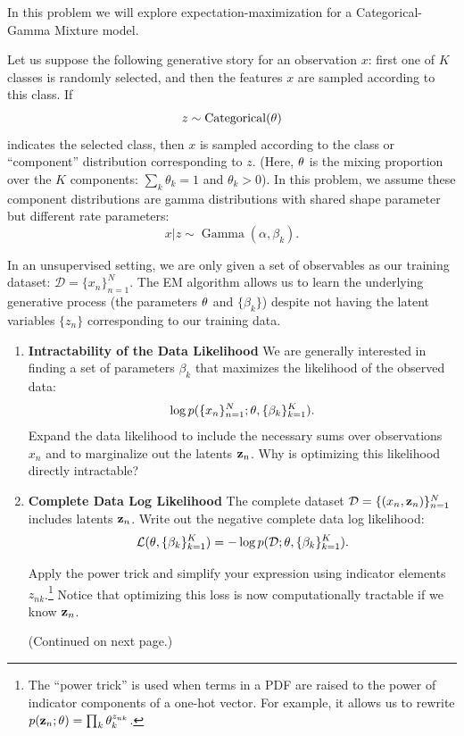 \documentclass[submit]{harvardml}
\begin{document}
\begin{problem}

In this problem we will explore expectation-maximization for a Categorical-Gamma Mixture model.

Let us suppose the following generative story for an observation $x$: first one of $K$ classes is randomly selected, and then the features $x$ are sampled according to this class. If $$z \sim \operatorname{Categorical}(\mathbf{\theta})$$ indicates the selected class, then $x$ is sampled according to the class or ``component'' distribution corresponding to $z$. (Here, $\mathbf{\theta}$ is the mixing proportion over the $K$ components: $\sum_k \theta_k = 1$ and $ \theta_k > 0$). In this problem, we assume these component distributions are gamma distributions with shared shape parameter but different rate parameters: $$x | z \sim \operatorname{Gamma}(\alpha, \beta_k).$$

In an unsupervised setting, we are only given a set of observables as our training dataset: $\mathcal D = \{x_n\}_{n=1}^N$. The EM algorithm allows us to learn the underlying generative process (the parameters $\mathbf{\theta}$ and $\{\beta_k\}$) despite not having the latent variables $\{z_n\}$ corresponding to our training data.

\vspace{2em}

\begin{enumerate}

  \item \textbf{Intractability of the Data Likelihood} We are
    generally interested in finding a set of parameters $\beta_k$ that
    maximizes the likelihood of the observed data: $$\log
    p(\{x_n\}^N_{n=1}; \mathbf{\theta}, \{\beta_k\}^K_{k = 1}).$$ Expand the data
    likelihood to include the necessary sums over observations
    $x_n$ and to marginalize out the latents
    $\mathbf{z}_n$. Why is optimizing this likelihood directly
    intractable?

\item \textbf{Complete Data Log Likelihood} The complete dataset
  $\mathcal D = \{(x_n, \mathbf{z}_n)\}_{n=1}^N$ includes latents $\mathbf{z}_n$. Write
  out the negative complete data log likelihood: $$\mathcal{L}(\mathbf{\theta}, \{\beta_k\}^K_{k=1}) =  -\log p(\mathcal D; \mathbf{\theta}, \{\beta_k\}^K_{k=1}).$$

  Apply the power trick and simplify your expression using indicator elements $z_{n
  k}$.\footnote{The ``power trick'' is used when terms in a PDF are raised to the power of indicator components of a one-hot vector.  For example, it allows us to rewrite $p(\mathbf{z}_n ;  \mathbf{\theta}) = \prod_k \theta_k^{z_{nk}}$.} Notice that optimizing this loss is now computationally tractable if we know $\mathbf{z}_n$.

  (Continued on next page.)

\end{enumerate}

\end{problem}
\end{document}
